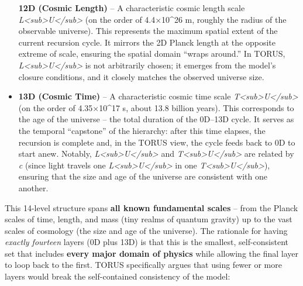 \documentclass[
]{article}
\begin{document}
\begin{itemize}
  \textbf{12D (Cosmic Length)} -- A characteristic cosmic length scale
  \emph{L\textless sub\textgreater U\textless/sub\textgreater{}} (on the
  order of 4.4×10\^{}26 m, roughly the radius of the observable
  universe)\hspace{0pt}. This represents the maximum spatial extent of
  the current recursion cycle. It mirrors the 2D Planck length at the
  opposite extreme of scale, ensuring the spatial domain ``wraps
  around.'' In TORUS,
  \emph{L\textless sub\textgreater U\textless/sub\textgreater{}} is not
  arbitrarily chosen; it emerges from the model's closure conditions,
  and it closely matches the observed universe size.
\item
  \textbf{13D (Cosmic Time)} -- A characteristic cosmic time scale
  \emph{T\textless sub\textgreater U\textless/sub\textgreater{}} (on the
  order of 4.35×10\^{}17 s, about 13.8 billion years)\hspace{0pt}. This
  corresponds to the age of the universe -- the total duration of the
  0D--13D cycle. It serves as the temporal ``capstone'' of the
  hierarchy: after this time elapses, the recursion is complete and, in
  the TORUS view, the cycle feeds back to 0D to start anew. Notably,
  \emph{L\textless sub\textgreater U\textless/sub\textgreater{}} and
  \emph{T\textless sub\textgreater U\textless/sub\textgreater{}} are
  related by \emph{c} (since light travels one
  \emph{L\textless sub\textgreater U\textless/sub\textgreater{}} in one
  \emph{T\textless sub\textgreater U\textless/sub\textgreater{}}),
  ensuring that the size and age of the universe are consistent with one
  another\hspace{0pt}.
\end{itemize}

This 14-level structure spans \textbf{all known fundamental scales} --
from the Planck scales of time, length, and mass (tiny realms of quantum
gravity) up to the vast scales of cosmology (the size and age of the
universe)\hspace{0pt}. The rationale for having \emph{exactly fourteen}
layers (0D plus 13D) is that this is the smallest, self-consistent set
that includes \textbf{every major domain of physics} while allowing the
final layer to loop back to the first. TORUS specifically argues that
using fewer or more layers would break the self-contained consistency of
the model:
\end{document}
